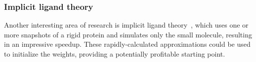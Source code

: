 \subsubsection{Implicit ligand theory}
%
Another interesting area of research is implicit ligand theory~\cite{Nguyen2018,Xie2017,Minh2012impl, Minharxiv}, which uses one or more snapshots of a rigid protein and simulates only the small molecule, resulting in an impressive speedup.
%
These rapidly-calculated approximations could be used to initialize the weights, providing a potentially profitable starting point.